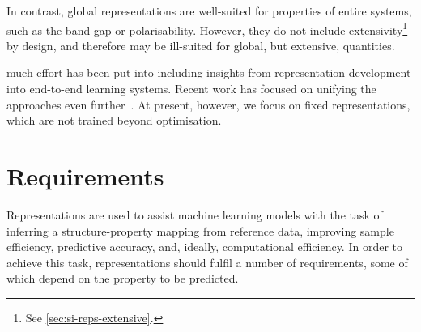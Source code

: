 In contrast, global representations are well-suited for properties of entire systems, such as the band gap or polarisability. However, they do not include extensivity\footnote{See \cref{sec:si-reps-extensive}.} by design, and therefore may be ill-suited for global, but extensive, quantities.

 much effort has been put into including insights from representation development into end-to-end learning systems. Recent work has focused on unifying the approaches even further~\cite{npfc2022q,bbkc2022a}.
At present, however, we focus on fixed representations, which are not trained beyond \hp optimisation.



\section{Requirements}

Representations are used to assist machine learning models with the task of inferring a structure-property mapping from reference data, improving sample efficiency, predictive accuracy, and, ideally, computational efficiency. In order to achieve this task, representations should fulfil a number of requirements, some of which depend on the property to be predicted.

